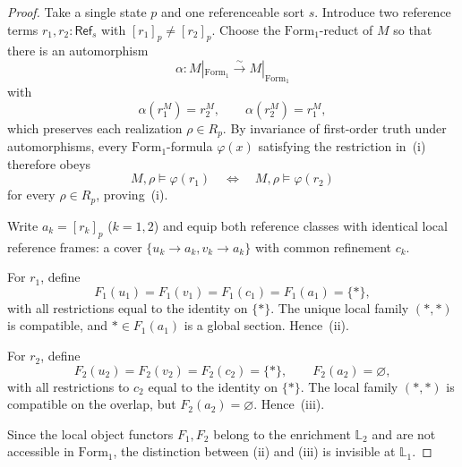 \begin{proof}
Take a single state $p$ and one referenceable sort $s$. Introduce two reference terms $r_1,r_2:\mathsf{Ref}_s$ with $[r_1]_p\neq [r_2]_p$. Choose the $\mathrm{Form}_1$-reduct of $M$ so that there is an automorphism
\[
\alpha:M|_{\mathrm{Form}_1}\xrightarrow{\sim} M|_{\mathrm{Form}_1}
\]
with
\[
\alpha(r_1^M)=r_2^M,
\qquad
\alpha(r_2^M)=r_1^M,
\]
which preserves each realization $\rho\in R_p$. By invariance of first-order truth under automorphisms, every $\mathrm{Form}_1$-formula $\varphi(x)$ satisfying the restriction in~\textup{(i)} therefore obeys
\[
M,\rho\models\varphi(r_1)
\quad\Longleftrightarrow\quad
M,\rho\models\varphi(r_2)
\]
for every $\rho\in R_p$, proving~\textup{(i)}.

Write $a_k=[r_k]_p$ ($k=1,2$) and equip both reference classes with identical local reference frames: a cover $\{u_k\to a_k,v_k\to a_k\}$ with common refinement $c_k$.

For $r_1$, define
\[
F_1(u_1)=F_1(v_1)=F_1(c_1)=F_1(a_1)=\{*\},
\]
with all restrictions equal to the identity on $\{*\}$. The unique local family $(*,*)$ is compatible, and $*\in F_1(a_1)$ is a global section. Hence~\textup{(ii)}.

For $r_2$, define
\[
F_2(u_2)=F_2(v_2)=F_2(c_2)=\{*\},\qquad F_2(a_2)=\varnothing,
\]
with all restrictions to $c_2$ equal to the identity on $\{*\}$. The local family $(*,*)$ is compatible on the overlap, but $F_2(a_2)=\varnothing$. Hence~\textup{(iii)}.

Since the local object functors $F_1,F_2$ belong to the enrichment $\mathbb{L}_2$ and are not accessible in $\mathrm{Form}_1$, the distinction between \textup{(ii)} and \textup{(iii)} is invisible at $\mathbb{L}_1$.
\end{proof}

